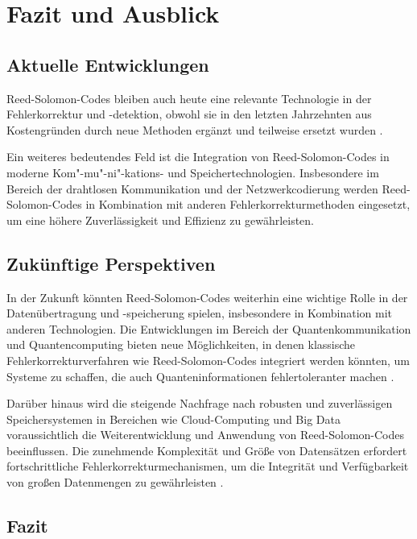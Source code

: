 \chapter{Fazit und Ausblick}\label{ch:summary}

\section{Aktuelle Entwicklungen}

Reed-Solomon-Codes bleiben auch heute eine relevante Technologie in der Fehlerkorrektur und -detektion, obwohl sie in den letzten Jahrzehnten aus Kostengründen durch neue Methoden ergänzt und teilweise ersetzt wurden \cite{ilievAnalysisEvaluationReedSolomon2008}. 

Ein weiteres bedeutendes Feld ist die Integration von Reed-Solomon-Codes in moderne Kom"-mu"-ni"-kations- und Speichertechnologien.
Insbesondere im Bereich der drahtlosen Kommunikation und der Netzwerkcodierung werden Reed-Solomon-Codes in Kombination mit anderen Fehlerkorrekturmethoden eingesetzt, um eine höhere Zuverlässigkeit und Effizienz zu gewährleisten.

\section{Zukünftige Perspektiven}

In der Zukunft könnten Reed-Solomon-Codes weiterhin eine wichtige Rolle in der Datenübertragung und -speicherung spielen, insbesondere in Kombination mit anderen Technologien. 
Die Entwicklungen im Bereich der Quantenkommunikation und Quantencomputing bieten neue Möglichkeiten, in denen klassische Fehlerkorrekturverfahren wie Reed-Solomon-Codes integriert werden könnten, um Systeme zu schaffen, die auch Quanteninformationen fehlertoleranter machen \cite{grasslQuantumReedSolomonCodes1999}.

Darüber hinaus wird die steigende Nachfrage nach robusten und zuverlässigen Speichersystemen in Bereichen wie Cloud-Computing und Big Data voraussichtlich die Weiterentwicklung und Anwendung von Reed-Solomon-Codes beeinflussen. 
Die zunehmende Komplexität und Größe von Datensätzen erfordert fortschrittliche Fehlerkorrekturmechanismen, um die Integrität und Verfügbarkeit von großen Datenmengen zu gewährleisten \cite{sathiamoorthyXORingElephantsNovel2013}.

\section{Fazit}

